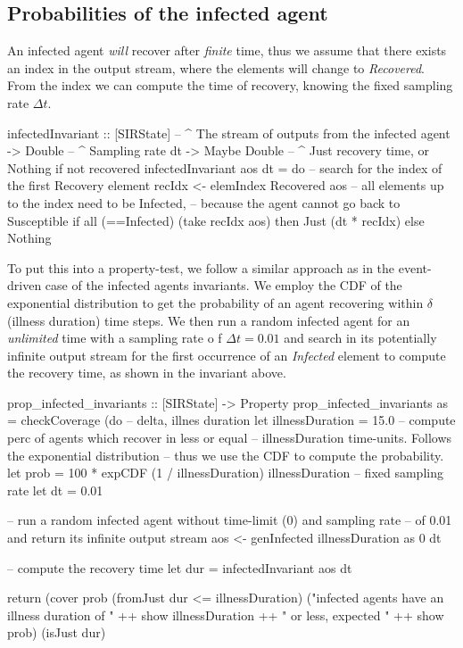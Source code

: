 \subsection{Probabilities of the infected agent}
An infected agent \textit{will} recover after \textit{finite} time, thus we assume that there exists an index in the output stream, where the elements will change to \textit{Recovered}. From the index we can compute the time of recovery, knowing the fixed sampling rate $\Delta t$.

\begin{HaskellCode}
infectedInvariant :: [SIRState]     -- ^ The stream of outputs from the infected agent
                  -> Double         -- ^ Sampling rate dt
                  -> Maybe Double   -- ^ Just recovery time, or Nothing if not recovered
infectedInvariant aos dt  = do
  -- search for the index of the first Recovery element
  recIdx <- elemIndex Recovered aos
  -- all elements up to the index need to be Infected,
  -- because the agent cannot go back to Susceptible
  if all (==Infected) (take recIdx aos)
    then Just (dt * recIdx)
    else Nothing
\end{HaskellCode}

To put this into a property-test, we follow a similar approach as in the event-driven case of the infected agents invariants. We employ the CDF of the exponential distribution to get the probability of an agent recovering within $\delta$ (illness duration) time steps. We then run a random infected agent for an \textit{unlimited} time with a sampling rate o f $\Delta t = 0.01$ and search in its potentially infinite output stream for the first occurrence of an \textit{Infected} element to compute the recovery time, as shown in the invariant above.

\begin{HaskellCode}
prop_infected_invariants :: [SIRState] -> Property
prop_infected_invariants as = checkCoverage (do
  -- delta, illnes duration
  let illnessDuration = 15.0
  -- compute perc of agents which recover in less or equal 
  -- illnessDuration time-units. Follows the exponential distribution
  -- thus we use the CDF to compute the probability.
  let prob = 100 * expCDF (1 / illnessDuration) illnessDuration
  -- fixed sampling rate
  let dt = 0.01

  -- run a random infected agent without time-limit (0) and sampling rate
  -- of 0.01 and return its infinite output stream 
  aos <- genInfected illnessDuration as 0 dt

  -- compute the recovery time
  let dur = infectedInvariant aos dt

  return (cover prob (fromJust dur <= illnessDuration)
            ("infected agents have an illness duration of " ++ show illnessDuration ++
             " or less, expected " ++ show prob) (isJust dur)
\end{HaskellCode}

